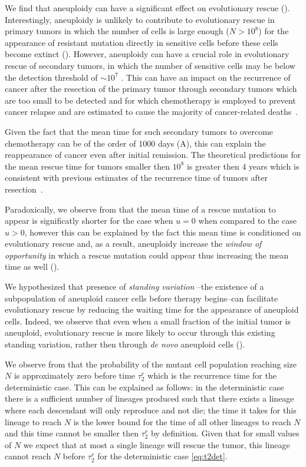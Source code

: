 \documentclass[12pt]{extarticle}
\begin{document}
We find that aneuploidy can have a significant effect on evolutionary rescue (). Interestingly, aneuploidy is unlikely to contribute to evolutionary rescue in primary tumors in which the number of cells is large enough ($N>10^8$) for the appearance of resistant mutation directly in sensitive cells before these cells become extinct ().
However, aneuploidy can have a crucial role in evolutionary rescue of secondary tumors, in which the number of sensitive cells may be below the detection threshold of $\sim10^7$  \citep{bozic2013evolutionary}. This can have an impact on the recurrence of cancer after the resection of the primary tumor  through secondary tumors which are too small to be detected and for which chemotherapy is employed to prevent  cancer relapse and are estimated to cause the majority of cancer-related deaths~\citep{chaffer2011perspective}. 

Given the fact that the mean time for such secondary tumors to overcome chemotherapy can be of the order of 1000 days (A), %
this can explain the reappearance of cancer even after initial remission. The theoretical predictions for the mean rescue time for tumors smaller then  $10^8$ is greater then 4 years which is consistent with previous estimates of the recurrence time of tumors after resection~\citep{avanzini2019cancer}.

Paradoxically, we observe from  that the mean time of a rescue mutation to appear is significatly shorter for the case when $u=0$ when compared to the case $u>0$, however this can be explained by the fact this mean time is conditioned on evolutionary rescue and, as a result, aneuploidy increase the \emph{window of opportunity} in which a rescue mutation could appear thus increasing the mean time as well ().

We hypothesized that presence of \emph{standing variation} 
--the existence of a subpopulation of aneuploid cancer cells before therapy begins--can facilitate evolutionary rescue by reducing the waiting time for the appearance of aneuploid cells. Indeed, we observe that even when a small fraction of the initial tumor is aneuploid, evolutionary rescue is more likely to occur through this existing standing variation, rather then through \emph{de novo} aneuploid cells ().

We observe from  that the probability of the mutant cell population reaching size $N$ is approximately zero before time $\tau_2^r$ which is the recurrence time for the deterministic case. This can be explained as follows: in the deterministic case there is a sufficient number of lineages produced such that there exists a lineage where each descendant will only reproduce and not die; the time it takes for this lineage to reach $N$ is the lower bound for the time of all other lineages to reach $N$ and this time cannot be smaller then $\tau_2^r$ by definition. Given that for small values of $N$ we expect that at most a single lineage will rescue the tumor, this lineage cannot reach $N$ before $\tau_2^r$ for the deterministic case \cref{eq:t2det}.
\end{document}
